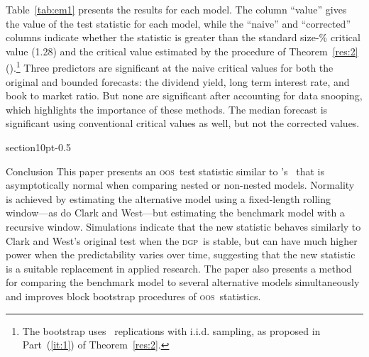 \documentclass[10pt,fleqn,draft]{article}
\makeatletter
\newcommand\poscw{\citeauthor{ClW:06}'s \citeyearpar{ClW:06,ClW:07}}
\renewcommand\section{\@startsection%
{section}{1}{0pt}{-\baselineskip}{0.5\baselineskip}%
{\normalfont\normalsize\bfseries\large\raggedright}}
\theoremstyle{definition}
\newcommand{\dgp}{\textsc{dgp}}
\newcommand{\oos}{\textsc{oos}}
\makeatother
\begin{document}
Table~\ref{tab:em1} presents the results for each model.  The column
``value'' gives the value of the test statistic for each model, while
the ``naive'' and ``corrected'' columns indicate whether the statistic
is greater than the standard size-\bootsize\% critical value (1.28)
and the critical value estimated by the procedure of
Theorem~\ref{res:2} (\empiricalcriticalvalue).\footnote{The bootstrap
  uses \nboot\ replications with i.i.d. sampling, as proposed in
  Part~(\ref{it:1}) of Theorem~\ref{res:2}.}  Three predictors are
significant at the naive critical values for both the original and
bounded forecasts: the dividend yield, long term interest rate, and
book to market ratio.  But none are significant after accounting for
data snooping, which highlights the importance of these methods.  The
median forecast is significant using conventional critical values as
well, but not the corrected values.

\begin{table}[tb!]
  \centering
  \empiricaltable
\caption{Results from \oos\ comparison of equity premium prediction
  models; the benchmark is the recursive sample mean of the equity
  premium and each alternative model is a constant and single lag of
  the variable listed in the ``predictor'' column.  The dataset begins
  in 1927 and ends in 2009 and is annual data. The ``value'' column
  lists the value of this paper's \oos\ statistic, the ``naive''
  column indicates whether the statistic is significant at standard
  critical values, and the ``corrected'' column indicates significance
  using the critical values proposed in Theorem~\ref{res:2} that
  account for the number of models.  See Section~\ref{sec:3} for details.}
\label{tab:em1}
\end{table}


\section{Conclusion}\label{sec:4}
This paper presents an \oos\ test statistic similar to \poscw\ that is
asymptotically normal when comparing nested or non-nested models.
Normality is achieved by estimating the alternative model using a
fixed-length rolling window---as do Clark and West---but estimating
the benchmark model with a recursive window.  Simulations indicate
that the new statistic behaves similarly to Clark and West's original
test when the \dgp\ is stable, but can have much higher power when the
predictability varies over time, suggesting that the new statistic is
a suitable replacement in applied research.  The paper also presents a
method for comparing the benchmark model to several alternative models
simultaneously and improves block bootstrap procedures of \oos\
statistics.
\end{document}

